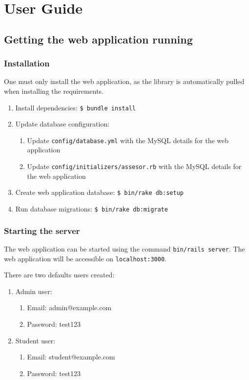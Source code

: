 \chapter{User Guide}

\section{Getting the web application running}
\subsection{Installation}
One must only install the web application, as the library is automatically pulled when installing the requirements.

\begin{enumerate}
    \item Install dependencies: \texttt{\$ bundle install}
    \item Update database configuration:
    \begin{enumerate}
        \item Update \texttt{config/database.yml} with the MySQL details for the web application
        \item Update \texttt{config/initializers/assesor.rb} with the MySQL details for the web application
    \end{enumerate}
    \item Create web application database: \texttt{\$ bin/rake db:setup}
    \item Run database migrations: \texttt{\$ bin/rake db:migrate}
\end{enumerate}

\subsection{Starting the server}

The web application can be started using the command \texttt{bin/rails server}. The web application will be accessible on \texttt{localhost:3000}.

There are two defaults users created:
\begin{enumerate}
    \item Admin user:
    \begin{enumerate}
        \item Email: admin@example.com
        \item Password: test123
    \end{enumerate}
    \item Student user:
    \begin{enumerate}
        \item Email: student@example.com
        \item Password: test123
    \end{enumerate}
\end{enumerate}

